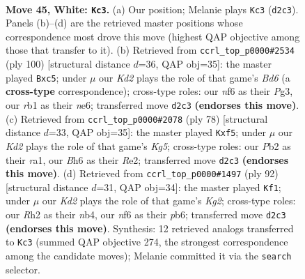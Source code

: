 \documentclass[11pt]{article}
\begin{document}
\clearpage

\begin{figure}[p]\centering
\begin{subfigure}{0.46\textwidth}\centering
\resizebox{\linewidth}{!}{%
\newchessgame
\chessboard[
  setfen={7k/5p2/5n1B/8/p3p2p/3p3P/PP1K1P1R/1r6 w - - 0 45},
  showmover=false,
  pgfstyle=straightmove, color=movearrow, markmove={d2-c3}
]}
\caption{}
\end{subfigure}\hfill
\begin{subfigure}{0.46\textwidth}\centering
\resizebox{\linewidth}{!}{%
\newchessgame
\chessboard[
  setfen={3k4/8/p1pBn1p1/2p4p/P1K1P2P/6P1/1P6/8 w - - 28 51},
  showmover=false,
  pgfstyle=straightmove, color=movearrow, markmove={d6-c5}
]}
\caption{}
\end{subfigure}
\\[4pt]
\begin{subfigure}{0.46\textwidth}\centering
\resizebox{\linewidth}{!}{%
\newchessgame
\chessboard[
  setfen={8/3k2p1/8/2Pp1pKp/1p1P4/5P2/1P2R3/r7 w - - 1 40},
  showmover=false,
  pgfstyle=straightmove, color=movearrow, markmove={g5-f5}
]}
\caption{}
\end{subfigure}\hfill
\begin{subfigure}{0.46\textwidth}\centering
\resizebox{\linewidth}{!}{%
\newchessgame
\chessboard[
  setfen={3r4/3P3R/1p5p/p3kp1P/Pnp5/5B2/1P4K1/8 w - - 3 47},
  showmover=false,
  pgfstyle=straightmove, color=movearrow, markmove={g2-f1}
]}
\caption{}
\end{subfigure}
\caption{\textbf{Move 45, White: \texttt{Kc3}.} (a) Our position; Melanie plays \texttt{Kc3} (\texttt{d2c3}). Panels (b)--(d) are the retrieved master positions whose correspondence most drove this move (highest QAP objective among those that transfer to it). (b) Retrieved from \texttt{ccrl\_top\_p0000\#2534} (ply 100) [structural distance $d$=36, QAP obj=35]: the master played \texttt{Bxc5}; under $\mu$ our \emph{Kd2} plays the role of that game's \emph{Bd6} (a \textbf{cross-type} correspondence); cross-type roles: our \emph{n}f6 as their \emph{P}g3, our \emph{r}b1 as their \emph{n}e6; transferred move \texttt{d2c3} \textbf{(endorses this move)}. (c) Retrieved from \texttt{ccrl\_top\_p0000\#2078} (ply 78) [structural distance $d$=33, QAP obj=35]: the master played \texttt{Kxf5}; under $\mu$ our \emph{Kd2} plays the role of that game's \emph{Kg5}; cross-type roles: our \emph{P}b2 as their \emph{r}a1, our \emph{B}h6 as their \emph{R}e2; transferred move \texttt{d2c3} \textbf{(endorses this move)}. (d) Retrieved from \texttt{ccrl\_top\_p0000\#1497} (ply 92) [structural distance $d$=31, QAP obj=34]: the master played \texttt{Kf1}; under $\mu$ our \emph{Kd2} plays the role of that game's \emph{Kg2}; cross-type roles: our \emph{R}h2 as their \emph{n}b4, our \emph{n}f6 as their \emph{p}b6; transferred move \texttt{d2c3} \textbf{(endorses this move)}. Synthesis: 12 retrieved analogs transferred to \texttt{Kc3} (summed QAP objective 274, the strongest correspondence among the candidate moves); Melanie committed it via the \texttt{search} selector.}
\label{fig:thought-m88}
\end{figure}
\end{document}
